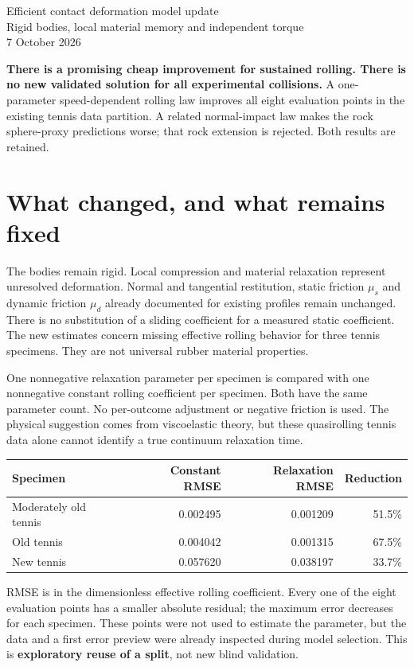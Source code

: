 \documentclass[10pt,a4paper]{article}
\begin{document}
\begin{center}\Large Efficient contact deformation model update\\[4pt]
\normalsize Rigid bodies, local material memory and independent torque\\7 October 2026\end{center}

\textbf{There is a promising cheap improvement for sustained rolling. There is no
new validated solution for all experimental collisions.} A one-parameter
speed-dependent rolling law improves all eight evaluation points in the existing
tennis data partition. A related normal-impact law makes the rock sphere-proxy
predictions worse; that rock extension is rejected. Both results are retained.

\section*{What changed, and what remains fixed}
The bodies remain rigid. Local compression and material relaxation represent
unresolved deformation. Normal and tangential restitution, static friction
$\mu_s$ and dynamic friction $\mu_d$ already documented for existing profiles
remain unchanged. There is no substitution of a sliding coefficient for a measured
static coefficient. The new estimates concern missing effective rolling behavior
for three tennis specimens. They are not universal rubber material properties.

One nonnegative relaxation parameter per specimen is compared with one nonnegative
constant rolling coefficient per specimen. Both have the same parameter count.
No per-outcome adjustment or negative friction is used. The physical suggestion
comes from viscoelastic theory, but these quasirolling tennis data alone cannot
identify a true continuum relaxation time.
\begin{center}\small
\begin{tabular}{lrrr}\hline
Specimen & Constant RMSE & Relaxation RMSE & Reduction\\\hline
Moderately old tennis & 0.002495 & 0.001209 & 51.5\% \\
Old tennis & 0.004042 & 0.001315 & 67.5\% \\
New tennis & 0.057620 & 0.038197 & 33.7\% \\
\hline\end{tabular}\end{center}
RMSE is in the dimensionless effective rolling coefficient. Every one of the eight
evaluation points has a smaller absolute residual; the maximum error decreases
for each specimen. These points were not used to estimate the parameter, but
the data and a first error preview were already inspected during model selection.
This is \textbf{exploratory reuse of a split}, not new blind validation.
\end{document}
